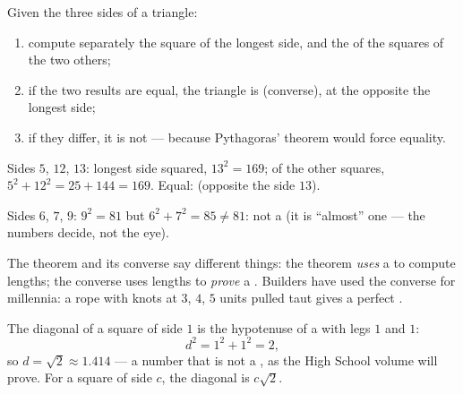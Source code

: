 \begin{method}\label{met:g8:pythagoras:test}
Given the three sides of a triangle:
\begin{enumerate}
  \item compute separately the square of the longest side, and the 
        of the squares of the two others;
  \item if the two results are equal, the triangle is 
        (converse), at the  opposite the longest side;
  \item if they differ, it is not  --- because Pythagoras'
        theorem would force equality.
\end{enumerate}
\end{method}

\begin{example}\label{ex:g8:pythagoras:test}
Sides $5$, $12$, $13$: longest side squared, $13^2 = 169$;  of the
other squares, $5^2 + 12^2 = 25 + 144 = 169$. Equal: 
(opposite the side $13$).

Sides $6$, $7$, $9$: $9^2 = 81$ but $6^2 + 7^2 = 85 \neq 81$: not a
 (it is ``almost'' one --- the numbers decide, not the
eye).
\end{example}

\begin{remark}
The theorem and its converse say different things: the theorem
\emph{uses} a  to compute lengths; the converse uses
lengths to \emph{prove} a . Builders have used the
converse for millennia: a rope with knots at $3$, $4$, $5$ units
pulled taut gives a perfect .
\end{remark}

\begin{example}\label{ex:g8:pythagoras:diagonal}
The diagonal of a square of side $1$ is the hypotenuse of a  with legs $1$ and $1$:
\[
d^2 = 1^2 + 1^2 = 2 ,
\]
so $d = \sqrt2 \approx 1.414$ --- a number that is not a , as
the High School volume will prove. For a square of side $c$, the
diagonal is $c\sqrt2$.
\end{example}

